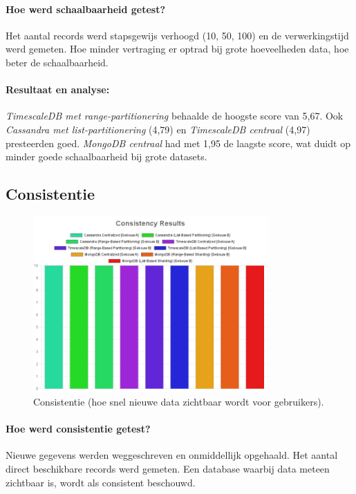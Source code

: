 \paragraph{Hoe werd schaalbaarheid getest?}
Het aantal records werd stapsgewijs verhoogd (10, 50, 100) en de verwerkingstijd werd gemeten. Hoe minder vertraging er optrad bij grote hoeveelheden data, hoe beter de schaalbaarheid.

\paragraph{Resultaat en analyse:}
\textit{TimescaleDB met range-partitionering} behaalde de hoogste score van 5,67. Ook \textit{Cassandra met list-partitionering} (4,79) en \textit{TimescaleDB centraal} (4,97) presteerden goed. \textit{MongoDB centraal} had met 1,95 de laagste score, wat duidt op minder goede schaalbaarheid bij grote datasets.

\subsection{Consistentie}
\begin{figure}[H]
\centering
\includegraphics[width=0.8\textwidth]{Consistency.png}
\caption{Consistentie (hoe snel nieuwe data zichtbaar wordt voor gebruikers).}
\label{fig:consistency-comparison}
\end{figure}

\paragraph{Hoe werd consistentie getest?}
Nieuwe gegevens werden weggeschreven en onmiddellijk opgehaald. Het aantal direct beschikbare records werd gemeten. Een database waarbij data meteen zichtbaar is, wordt als consistent beschouwd.

